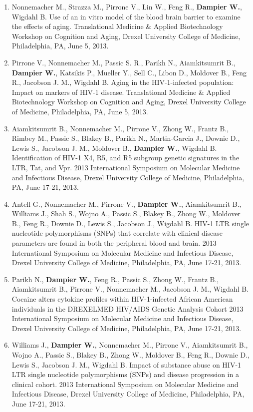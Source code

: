\documentclass[a4paper,11pt]{article}
\begin{document}
\begin{enumerate}
\begin{itemize}
\begin{enumerate}[label=\arabic{enumii}.]
   \item Nonnemacher M., Strazza M., Pirrone V., Lin W., Feng R., \textbf{Dampier W.}, Wigdahl B.  Use of an in vitro model of the blood brain barrier to examine the effects of aging.  Translational Medicine \& Applied Biotechnology Workshop on Cognition and Aging, Drexel University College of Medicine, Philadelphia, PA, June 5, 2013.
   \item Pirrone V., Nonnemacher M., Passic S. R., Parikh N., Aiamkitsumrit B., \textbf{Dampier W.}, Katsikis P., Mueller Y., Sell C., Libon D., Moldover B., Feng R., Jacobson J. M., Wigdahl B.  Aging in the HIV-1-infected population: Impact on markers of HIV-1 disease.  Translational Medicine \& Applied Biotechnology Workshop on Cognition and Aging, Drexel University College of Medicine, Philadelphia, PA, June 5, 2013.
   \item Aiamkitsumrit B., Nonnemacher M., Pirrone V., Zhong W., Frantz B., Rimbey M., Passic S., Blakey B., Parikh N., Martin-Garcia J., Downie D., Lewis S., Jacobson J. M., Moldover B., \textbf{Dampier W.}, Wigdahl B. Identification of HIV-1 X4, R5, and R5 subgroup genetic signatures in the LTR, Tat, and Vpr.  2013 International Symposium on Molecular Medicine and Infectious Disease, Drexel University College of Medicine, Philadelphia, PA, June 17-21, 2013.
   \item Antell G., Nonnemacher M., Pirrone V., \textbf{Dampier W.}, Aiamkitsumrit B., Williams J., Shah S., Wojno A., Passic S., Blakey B., Zhong W., Moldover B., Feng R., Downie D., Lewis S., Jacobson J., Wigdahl B. HIV-1 LTR single nucleotide polymorphisms (SNPs) that correlate with clinical disease parameters are found in both the peripheral blood and brain.  2013 International Symposium on Molecular Medicine and Infectious Disease, Drexel University College of Medicine, Philadelphia, PA, June 17-21, 2013.
   \item Parikh N., \textbf{Dampier W.}, Feng R., Passic S., Zhong W., Frantz B., Aiamkitsumrit B., Pirrone V., Nonnemacher M., Jacobson J. M., Wigdahl B. Cocaine alters cytokine profiles within HIV-1-infected African American individuals in the DREXELMED HIV/AIDS Genetic Analysis Cohort 2013 International Symposium on Molecular Medicine and Infectious Disease, Drexel University College of Medicine, Philadelphia, PA, June 17-21, 2013.
   \item Williams J., \textbf{Dampier W.}, Nonnemacher M., Pirrone V., Aiamkitsumrit B., Wojno A., Passic S., Blakey B., Zhong W., Moldover B., Feng R., Downie D., Lewis S., Jacobson J. M., Wigdahl B. Impact of substance abuse on HIV-1 LTR single nucleotide polymorphisms (SNPs) and disease progression in a clinical cohort.  2013 International Symposium on Molecular Medicine and Infectious Disease, Drexel University College of Medicine, Philadelphia, PA, June 17-21, 2013.

\end{enumerate}
\end{itemize}
\end{enumerate}
\end{document}
